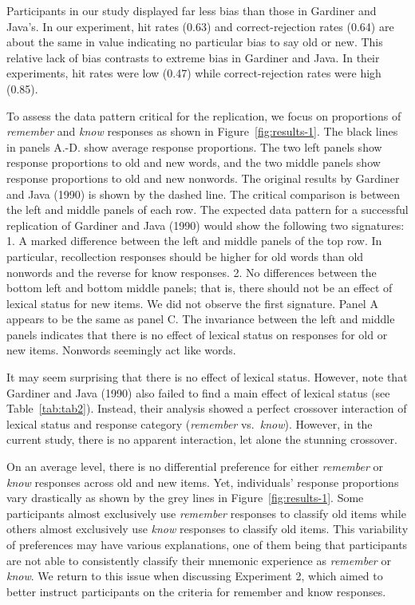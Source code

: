 \documentclass[english,,man,floatsintext]{apa6}
\begin{document}
Participants in our study displayed far less bias than those in Gardiner and Java's. In our experiment, hit rates (0.63) and correct-rejection rates (0.64) are about the same in value indicating no particular bias to say old or new. This relative lack of bias contrasts to extreme bias in Gardiner and Java. In their experiments, hit rates were low (0.47) while correct-rejection rates were high (0.85).

To assess the data pattern critical for the replication, we focus on proportions of \emph{remember} and \emph{know} responses as shown in Figure~\ref{fig:results-1}. The black lines in panels A.-D. show average response proportions. The two left panels show response proportions to old and new words, and the two middle panels show response proportions to old and new nonwords. The original results by Gardiner and Java (1990) is shown by the dashed line. The critical comparison is between the left and middle panels of each row. The expected data pattern for a successful replication of Gardiner and Java (1990) would show the following two signatures: 1. A marked difference between the left and middle panels of the top row. In particular, recollection responses should be higher for old words than old nonwords and the reverse for know responses. 2. No differences between the bottom left and bottom middle panels; that is, there should not be an effect of lexical status for new items. We did not observe the first signature. Panel A appears to be the same as panel C. The invariance between the left and middle panels indicates that there is no effect of lexical status on responses for old or new items. Nonwords seemingly act like words.

It may seem surprising that there is no effect of lexical status. However, note that Gardiner and Java (1990) also failed to find a main effect of lexical status (see Table~\ref{tab:tab2}). Instead, their analysis showed a perfect crossover interaction of lexical status and response category (\emph{remember} vs.~\emph{know}). However, in the current study, there is no apparent interaction, let alone the stunning crossover.

On an average level, there is no differential preference for either \emph{remember} or \emph{know} responses across old and new items. Yet, individuals' response proportions vary drastically as shown by the grey lines in Figure~\ref{fig:results-1}. Some participants almost exclusively use \emph{remember} responses to classify old items while others almost exclusively use \emph{know} responses to classify old items. This variability of preferences may have various explanations, one of them being that participants are not able to consistently classify their mnemonic experience as \emph{remember} or \emph{know}. We return to this issue when discussing Experiment 2, which aimed to better instruct participants on the criteria for remember and know responses.
\end{document}
